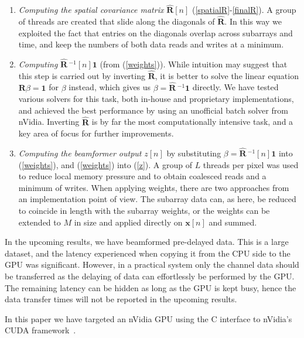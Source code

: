 \documentclass[12pt,journal,captionsoff,onecolumn]{IEEEtran}
\renewcommand\vec[1]{\boldsymbol{#1}}
\newcommand\mat[1]{\boldsymbol{#1}}
\newcommand\1{\vec 1}
\newcommand*\x{\vec x}
\newcommand*\R{\mat R}
\newcommand*\eR{\mat{\hat R}}
\newcommand*\eRi{\hat{\mat R}\,\!^{-1}}
\begin{document}
\begin{enumerate}
\item \emph{Computing the spatial covariance matrix} $\eR[n]$ (\ref{spatialR}-\ref{finalR}). A group of threads are created that slide along the diagonals of $\eR$. In this way we exploited the fact that entries on the diagonals overlap across subarrays and time, and keep the numbers of both data reads and writes at a minimum.
\item \emph{Computing} $\eRi[n]\1$ (from (\ref{weights})). While intuition may suggest that this step is carried out by inverting $\eR$, it is better to solve the linear equation $\R\beta = \1$ for $\beta$ instead, which gives us $\beta = \eRi\1$ directly. We have tested various solvers for this task, both in-house and proprietary implementations, and achieved the best performance by using an unofficial batch solver from nVidia. Inverting $\eR$ is by far the most computationally intensive task, and a key area of focus for further improvements.
\item \emph{Computing the beamformer output} $z[n]$ by substituting $\beta = \eRi[n]\1$ into (\ref{weights}), and (\ref{weights}) into (\ref{z}). A group of $L$ threads per pixel was used to reduce local memory pressure and to obtain coalesced reads and a minimum of writes. When applying weights, there are two approaches from an implementation point of view. The subarray data can, as here, be reduced to coincide in length with the subarray weights, or the weights can be extended to $M$ in size and applied directly on $\x[n]$ and summed.  
\end{enumerate}

In the upcoming results, we have beamformed pre-delayed data. This is a large dataset, and the latency experienced when copying it from the \gls{CPU} side to the \gls{GPU} was significant. However, in a practical system only the channel data should be transferred as the delaying of data can effortlessly be performed by the \gls{GPU}. The remaining latency can be hidden as long as the \gls{GPU} is kept busy, hence the data transfer times will not be reported in the upcoming results.

In this paper we have targeted an nVidia \gls{GPU} using the C interface to nVidia's \gls{CUDA} framework~\cite{NvidiaCuda}.
\end{document}
